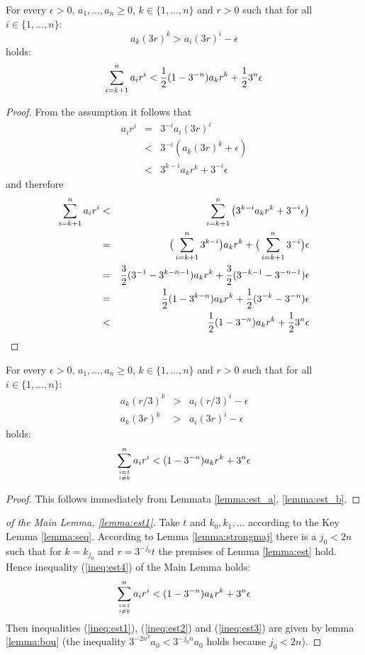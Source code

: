 \begin{lemma}\label{lemma:est_b}
For every $\epsilon > 0$, $a_1,\ldots,a_n \ge 0$, $k\in\{1,\ldots,n\}$
and $r > 0$ such that for all $i\in\{1,\ldots,n\}$:
$$a_k (3r)^k > a_i (3r)^i - \epsilon$$
holds:
$$\sum_{i=k+1}^n a_i r^i < {1\over 2}(1 - 3^{-n}) a_k r^k + {1\over 2}3^n\epsilon$$
\end{lemma}
\begin{proof}
From the assumption it follows that
\begin{eqnarray*}
a_i r^i &=& 3^{-i} a_i (3r)^i\\
&<& 3^{-i} (a_k (3r)^k + \epsilon)\\
&<& 3^{k-i} a_k r^k + 3^{-i}\epsilon
\end{eqnarray*}
and therefore
\begin{eqnarray*}
\sum_{i=k+1}^{n} a_i r^i &<& \sum_{i=k+1}^{n} \left(3^{k-i} a_k r^k 
	+ 3^{-i}\epsilon\right)\\
&=& \big(\sum_{i=k+1}^{n} 3^{k-i}\big) a_k r^k 
	+ \big(\sum_{i=k+1}^{n} 3^{-i}\big)\epsilon\\
&=& {3\over 2}(3^{-1}-3^{k-n-1}) a_k r^k 
	+ {3\over 2}(3^{-k-1}-3^{-n-1})\epsilon\\
&=& {1\over 2}(1 - 3^{k-n}) a_k r^k + {1\over 2}(3^{-k}-3^{-n})\epsilon\\
&<& {1\over 2}(1 - 3^{-n}) a_k r^k + {1\over 2}3^n\epsilon
\end{eqnarray*}
\end{proof}

\begin{lemma}\label{lemma:est}
For every $\epsilon > 0$, $a_1,\ldots,a_n \ge 0$, $k\in\{1,\ldots,n\}$ 
and $r > 0$ such that for all $i\in\{1,\ldots,n\}$:
\begin{eqnarray*}
a_k (r/3)^k &>& a_i (r/3)^i - \epsilon\\
a_k (3r)^k &>& a_i (3r)^i - \epsilon
\end{eqnarray*}
holds:
$$\sum_{i=1\atop i\ne k}^n a_i r^i < (1 - 3^{-n}) a_k r^k + 3^n\epsilon$$
\end{lemma}
\begin{proof}
This follows immediately from Lemmata \ref{lemma:est_a}, \ref{lemma:est_b}.
\end{proof}

\begin{proof}[of the Main Lemma, \ref{lemma:est1}]
Take $t$ and $k_0, k_1, \ldots$ according to the Key Lemma \ref{lemma:seq}.
According to Lemma \ref{lemma:strongmaj} there is a $j_0 < 2n$ such
that for $k= k_{j_0}$ and $r = 3^{-j_0} t$ the premises of Lemma
\ref{lemma:est} hold. Hence inequality (\ref{ineq:est4}) of the Main Lemma 
holds:
$$\sum_{i=1\atop i\ne k}^n a_i r^i < (1 - 3^{-n}) a_k r^k + 3^n\epsilon$$
Then inequalities (\ref{ineq:est1}), (\ref{ineq:est2}) and
(\ref{ineq:est3}) are given by lemma \ref{lemma:bou}
(the inequality $3^{-2n^2} a_0 < 3^{-j_0 n} a_0$ holds because $j_0 < 2n$).
\end{proof}

